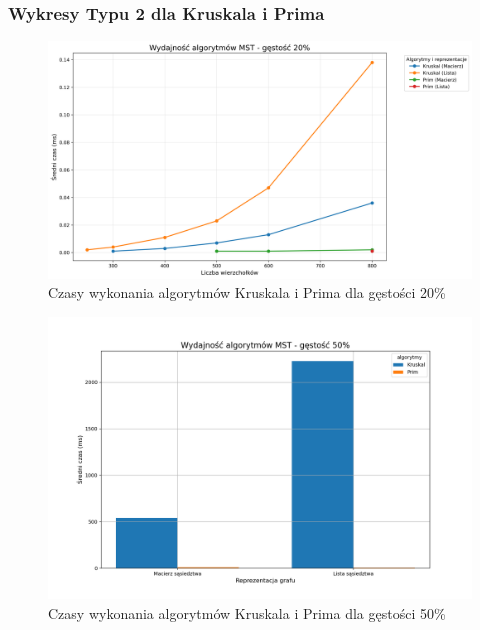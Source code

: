 \documentclass{article}
\begin{document}
\subsubsection{Wykresy Typu 2 dla Kruskala i Prima}

\begin{figure}[H]
    \centering
    \includegraphics[scale=0.5]{../Python/charts_type2/Typ2_MST_gestosc20_wykres.png}
    \caption{Czasy wykonania algorytmów Kruskala i Prima dla gęstości 20\%}
\end{figure}
\begin{figure}[H]
    \centering
    \includegraphics[scale=0.5]{../Python/charts_type2/Typ2_MST_gestosc50_wykres.png}
    \caption{Czasy wykonania algorytmów Kruskala i Prima dla gęstości 50\%}
\end{figure}
\end{document}
